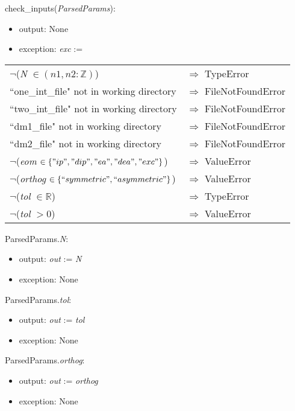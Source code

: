 \documentclass[12pt, titlepage]{article}
\begin{document}
\noindent check\_inputs(\textit{ParsedParams}):
\begin{itemize}
	\item output: None 
	\item exception: \textit{exc} :=  
\end{itemize}
\noindent \begin{longtable*}[l]{l l}
	$\neg$(\textit{N} $\in (n1, n2:\mathbb{Z})$) & $\Rightarrow$ TypeError\\
	``one\_int\_file" not in working directory & $\Rightarrow$ 
	FileNotFoundError\\
	``two\_int\_file" not in working directory & $\Rightarrow$ 
	FileNotFoundError\\
	``dm1\_file" not in working directory & $\Rightarrow$ 
	FileNotFoundError\\
	``dm2\_file" not in working directory & $\Rightarrow$ 
	FileNotFoundError\\
	$\neg$(\textit{eom} $\in \{"ip", "dip", "ea", "dea", "exc"\}$)  & 
	$\Rightarrow$ ValueError\\
	$\neg$(\textit{orthog} $\in \{``symmetric", ``asymmetric"\}$) & 
	$\Rightarrow$ ValueError\\
	$\neg$(\textit{tol} $\in \mathbb{R}$) & $\Rightarrow$ TypeError\\
	$\neg$(\textit{tol} $> 0$) & $\Rightarrow$ ValueError\\
\end{longtable*}

\noindent ParsedParams.\textit{N}:
\begin{itemize}
	\item output: \textit{out} := \textit{N} 
	\item exception: None 
\end{itemize}

\noindent ParsedParams.\textit{tol}:
\begin{itemize}
	\item output: \textit{out} := \textit{tol} 
	\item exception: None 
\end{itemize}

\noindent ParsedParams.\textit{orthog}:
\begin{itemize}
	\item output: \textit{out} := \textit{orthog} 
	\item exception: None 
\end{itemize}
\end{document}
